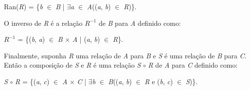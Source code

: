 \begin{center}
Ran(\textit{R}) = \{\textit{b} $\in$ \textit{B} | $\exists$\textit{a} $\in$ \textit{A}((\textit{a}, \textit{b}) $\in$ \textit{R})\}. 
\end{center}
O inverso de \textit{R} é a relação $\textit{R}^{-1}$ de \textit{B} para \textit{A} definido como:

\begin{center}
$\textit{R}^{-1}$ = \{(\textit{b}, \textit{a}) $\in$ \textit{B} $\times$ \textit{A} | (\textit{a}, \textit{b}) $\in$ \textit{R}\}. 
\end{center}

Finalmente, suponha \textit{R} uma relação de \textit{A} para \textit{B} e \textit{S} é uma relação de \textit{B} para \textit{C}.
Então a composição de \textit{S} e \textit{R} é uma relação \textit{S} $\circ$ \textit{R} de \textit{A} para \textit{C} definido 
como:

\begin{center}
\textit{S} $\circ$ \textit{R} = \{(\textit{a}, \textit{c}) $\in$ \textit{A} $\times$ \textit{C} | $\exists$\textit{b} $\in$
\textit{B}((\textit{a}, \textit{b}) $\in$ \textit{R} e (\textit{b}, \textit{c}) $\in$ \textit{S})\}. 
\end{center}
